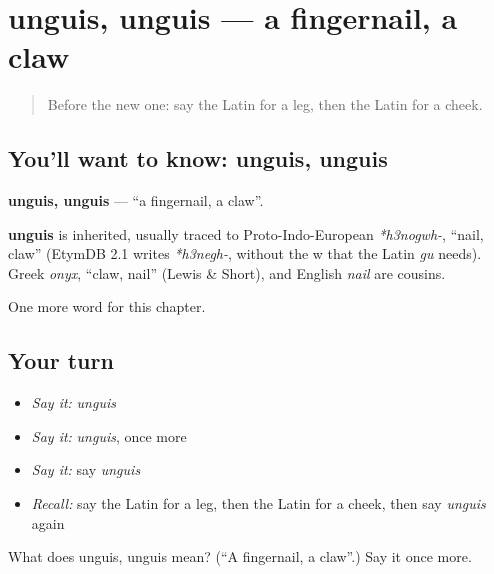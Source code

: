 \section[unguis, unguis]{unguis, unguis — a fingernail, a claw}

\label{lesson:LA-C66-unguis}



\begin{quote}
Before the new one: say the Latin for a leg, then the Latin for a cheek.
\end{quote}

\subsection*{You'll want to know: unguis, unguis}
\textbf{unguis, unguis} — \textquotedblleft{}a fingernail, a claw\textquotedblright{}.

\begin{cousinweb}
\textbf{unguis} is inherited, usually traced to Proto-Indo-European \emph{*h3nogwh-}, \textquotedblleft{}nail, claw\textquotedblright{} (EtymDB 2.1 writes \emph{*h3negh-}, without the w that the Latin \emph{gu} needs). Greek \emph{onyx}, \textquotedblleft{}claw, nail\textquotedblright{} (Lewis \& Short), and English \emph{nail} are cousins.
\end{cousinweb}

\begin{grammarlens}[title={What you've built}]
One more word for this chapter.
\end{grammarlens}

\subsection*{Your turn}
\begin{itemize}
\raggedright
  \item \emph{Say it:} \emph{unguis}
  \item \emph{Say it:} \emph{unguis}, once more
  \item \emph{Say it:} say \emph{unguis}
  \item \emph{Recall:} say the Latin for a leg, then the Latin for a cheek, then say \emph{unguis} again
\end{itemize}

\begin{tcolorbox}[breakable,colback=teal!4,colframe=teal!35!black,title={Before you move on}]
What does unguis, unguis mean? (\textquotedblleft{}A fingernail, a claw\textquotedblright{}.) Say it once more.
\end{tcolorbox}
